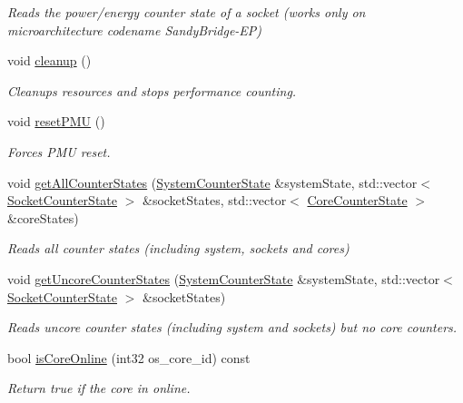 \begin{DoxyCompactItemize}
\begin{DoxyCompactList}\small\item\em Reads the power/energy counter state of a socket (works only on microarchitecture codename Sandy\+Bridge-\/\+EP) \end{DoxyCompactList}\item 
void \mbox{\hyperlink{class_p_c_m_ac0c8d3764ff95840ece17d632de4df9b}{cleanup}} ()
\begin{DoxyCompactList}\small\item\em Cleanups resources and stops performance counting. \end{DoxyCompactList}\item 
void \mbox{\hyperlink{class_p_c_m_ad4f5ff2c6ce12f0fb4bb5ae1e5bd157a}{reset\+P\+MU}} ()
\begin{DoxyCompactList}\small\item\em Forces P\+MU reset. \end{DoxyCompactList}\item 
void \mbox{\hyperlink{class_p_c_m_ade92d30321a659ca54d423eaf0e30e12}{get\+All\+Counter\+States}} (\mbox{\hyperlink{class_system_counter_state}{System\+Counter\+State}} \&system\+State, std\+::vector$<$ \mbox{\hyperlink{class_socket_counter_state}{Socket\+Counter\+State}} $>$ \&socket\+States, std\+::vector$<$ \mbox{\hyperlink{class_core_counter_state}{Core\+Counter\+State}} $>$ \&core\+States)
\begin{DoxyCompactList}\small\item\em Reads all counter states (including system, sockets and cores) \end{DoxyCompactList}\item 
void \mbox{\hyperlink{class_p_c_m_a9f1ffc2220b041f739a672b5be82361f}{get\+Uncore\+Counter\+States}} (\mbox{\hyperlink{class_system_counter_state}{System\+Counter\+State}} \&system\+State, std\+::vector$<$ \mbox{\hyperlink{class_socket_counter_state}{Socket\+Counter\+State}} $>$ \&socket\+States)
\begin{DoxyCompactList}\small\item\em Reads uncore counter states (including system and sockets) but no core counters. \end{DoxyCompactList}\item 
bool \mbox{\hyperlink{class_p_c_m_aabb7e0514fd741966fec461ccd9427f3}{is\+Core\+Online}} (int32 os\+\_\+core\+\_\+id) const
\begin{DoxyCompactList}\small\item\em Return true if the core in online. \end{DoxyCompactList}\item 

\end{DoxyCompactItemize}
